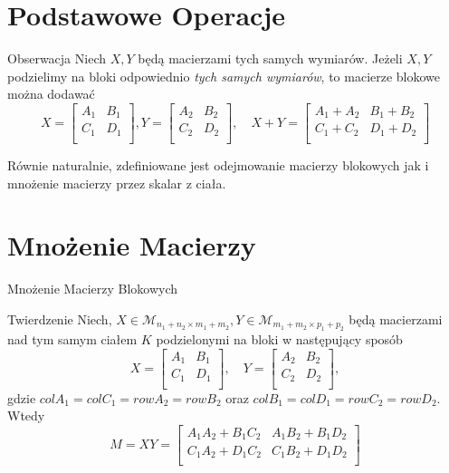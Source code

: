 \documentclass{beamer}
\begin{document}
\section{Podstawowe Operacje} 

\begin{frame}
    \begin{block}{Obserwacja}
        Niech $X,Y$ będą macierzami tych samych wymiarów. Jeżeli $X,Y$ podzielimy na bloki 
        odpowiednio \textit{tych samych wymiarów}, to macierze blokowe można dodawać
        $$X = \begin{bmatrix}
            A_1 & B_1 \\ C_1 & D_1 \\
        \end{bmatrix},
        Y = \begin{bmatrix}
            A_2& B_2 \\ C_2 & D_2 \\
        \end{bmatrix}, \quad 
        X + Y = \begin{bmatrix}
            A_1 + A_2 & B_1 + B_2 \\ C_1 + C_2 & D_1 + D_2 \\ 
        \end{bmatrix}$$
    \end{block}
    Równie naturalnie, zdefiniowane jest odejmowanie macierzy blokowych jak i mnożenie macierzy przez skalar z ciała.
\end{frame}

\section{Mnożenie Macierzy}

\begin{frame}{Mnożenie Macierzy Blokowych}
    \begin{block}{Twierdzenie}
        Niech, $X \in \mathcal{M}_{n_1 + n_2 \times m_1 + m_2},Y \in \mathcal{M}_{m_1 + m_2 \times p_1 + p_2}$ będą macierzami nad tym samym ciałem $K$ podzielonymi na bloki w następujący sposób
        $$X =\begin{bmatrix}
            A_1 & B_1 \\ C_1 & D_1 \\
        \end{bmatrix}, \quad Y = \begin{bmatrix}
            A_2 & B_2 \\ C_2 & D_2 \\ 
        \end{bmatrix},$$  gdzie $col A_1 = col C_1 = row A_2 = row B_2$ oraz $col B_1 = col D_1 = row C_2 = row D_2 .$
        \newline 
        Wtedy 
        $$ M = XY = \begin{bmatrix}
            A_1 A_2 +  B_1 C_2 & A_1 B_2 + B_1 D_2 \\
            C_1 A_2 + D_1 C_2 & C_1 B_2 + D_1 D_2 \\
        \end{bmatrix}$$
    \end{block}
\end{frame}
\end{document}
